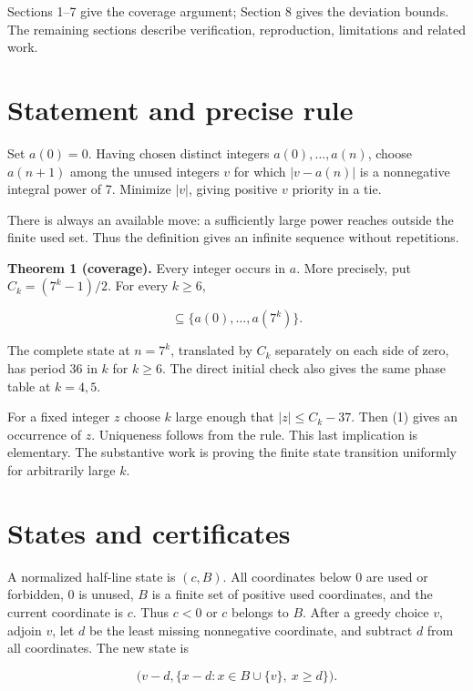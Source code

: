 \documentclass[11pt,a4paper]{article}
\begin{document}
Sections 1--7 give the coverage argument; Section 8 gives the deviation
bounds. The remaining sections describe verification, reproduction,
limitations and related work.


\section{Statement and precise rule}
\label{sec:1}

Set $a(0)=0$. Having chosen distinct integers $a(0),\ldots,a(n)$, choose $a(n+1)$ among the unused integers $v$ for which $|v-a(n)|$ is a nonnegative integral power of 7. Minimize $|v|$, giving positive $v$ priority in a tie.

There is always an available move: a sufficiently large power reaches outside the finite used set. Thus the definition gives an infinite sequence without repetitions.

\noindent\textbf{Theorem 1 (coverage).} Every integer occurs in $a$. More precisely, put $C_k=(7^k-1)/2$. For every $k\ge6$,

\begin{equation*}
[-C_k+37,C_k-37]\subseteq\{a(0),\ldots,a(7^k)\}. \tag{1}\label{eq:coverage}
\end{equation*}

The complete state at $n=7^k$, translated by $C_k$ separately on each side of zero, has period 36 in $k$ for $k\ge6$. The direct initial check also gives the same phase table at $k=4,5$.

For a fixed integer $z$ choose $k$ large enough that $|z|\le C_k-37$. Then (1) gives an occurrence of $z$. Uniqueness follows from the rule. This last implication is elementary. The substantive work is proving the finite state transition uniformly for arbitrarily large $k$.

\section{States and certificates}
\label{sec:2}

A normalized half-line state is $(c,B)$. All coordinates below 0 are used or forbidden, 0 is unused, $B$ is a finite set of positive used coordinates, and the current coordinate is $c$. Thus $c<0$ or $c$ belongs to $B$. After a greedy choice $v$, adjoin $v$, let $d$ be the least missing nonnegative coordinate, and subtract $d$ from all coordinates. The new state is

\begin{equation*}
\bigl(v-d,\{x-d:x\in B\cup\{v\},\ x\ge d\}\bigr). \tag{2}\label{eq:normalize}
\end{equation*}
\end{document}
